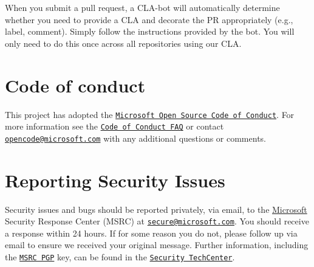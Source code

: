 When you submit a pull request, a C\+L\+A-\/bot will automatically determine whether you need to provide a C\+LA and decorate the PR appropriately (e.\+g., label, comment). Simply follow the instructions provided by the bot. You will only need to do this once across all repositories using our C\+LA.

\section*{Code of conduct}

This project has adopted the \href{https://opensource.microsoft.com/codeofconduct/}{\tt Microsoft Open Source Code of Conduct}. For more information see the \href{https://opensource.microsoft.com/codeofconduct/faq/}{\tt Code of Conduct F\+AQ} or contact \href{mailto:opencode@microsoft.com}{\tt opencode@microsoft.\+com} with any additional questions or comments.

\section*{Reporting Security Issues}

Security issues and bugs should be reported privately, via email, to the \mbox{\hyperlink{namespaceMicrosoft}{Microsoft}} Security Response Center (M\+S\+RC) at \href{mailto:secure@microsoft.com}{\tt secure@microsoft.\+com}. You should receive a response within 24 hours. If for some reason you do not, please follow up via email to ensure we received your original message. Further information, including the \href{https://technet.microsoft.com/en-us/security/dn606155}{\tt M\+S\+RC P\+GP} key, can be found in the \href{https://technet.microsoft.com/en-us/security/default}{\tt Security Tech\+Center}. 